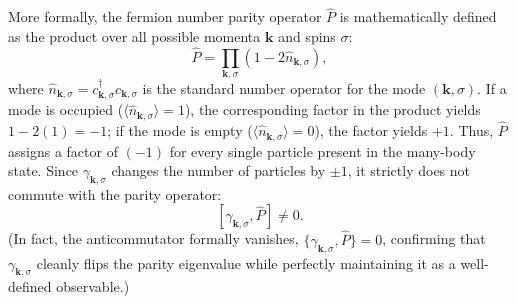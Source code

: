 More formally, the fermion number parity operator \( \hat{P} \) is mathematically defined as the product over all possible momenta \( \mathbf{k} \) and spins \( \sigma \):
\[
    \hat{P} = \prod_{\mathbf{k},\sigma} (1 - 2\hat{n}_{\mathbf{k},\sigma}),
\]
where \( \hat{n}_{\mathbf{k},\sigma} = c_{\mathbf{k},\sigma}^\dagger c_{\mathbf{k},\sigma} \) is the standard number operator for the mode \( (\mathbf{k}, \sigma) \). If a mode is occupied (\( \langle\hat{n}_{\mathbf{k},\sigma}\rangle = 1 \)), the corresponding factor in the product yields \( 1 - 2(1) = -1 \); if the mode is empty (\( \langle\hat{n}_{\mathbf{k},\sigma}\rangle = 0 \)), the factor yields \( +1 \). Thus, \( \hat{P} \) assigns a factor of \( (-1) \) for every single particle present in the many-body state. Since \( \gamma_{\mathbf{k},\sigma} \) changes the number of particles by \( \pm 1 \), it strictly does not commute with the parity operator:
\[
    [\gamma_{\mathbf{k},\sigma}, \hat{P}] \neq 0.
\]
(In fact, the anticommutator formally vanishes, \( \{\gamma_{\mathbf{k},\sigma}, \hat{P}\} = 0 \), confirming that \( \gamma_{\mathbf{k},\sigma} \) cleanly flips the parity eigenvalue while perfectly maintaining it as a well-defined observable.)


